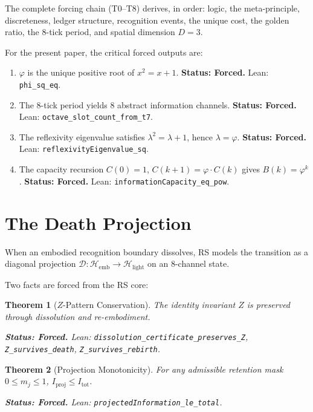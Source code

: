 \documentclass[11pt,a4paper]{article}
\newtheorem{theorem}{Theorem}[section]
\theoremstyle{definition}
\newcommand{\phig}{\varphi}
\newcommand{\Zp}{Z}
\newcommand{\code}[1]{\texttt{\small #1}}
\newcommand{\forced}[1]{\noindent\textbf{Status: Forced.} #1}
\begin{document}
The complete forcing chain (T0--T8) derives, in order:
logic, the meta-principle, discreteness, ledger structure,
recognition events, the unique cost, the golden ratio,
the 8-tick period, and spatial dimension $D=3$.

For the present paper, the critical forced outputs are:
\begin{enumerate}[label=(\roman*)]
\item $\phig$ is the unique positive root of $x^2=x+1$.
  \hfill \forced{Lean: \code{phi\_sq\_eq}.}
\item The 8-tick period yields 8 abstract information channels.
  \hfill \forced{Lean: \code{octave\_slot\_count\_from\_t7}.}
\item The reflexivity eigenvalue satisfies $\lambda^2=\lambda+1$,
  hence $\lambda=\phig$.
  \hfill \forced{Lean: \code{reflexivityEigenvalue\_sq}.}
\item The capacity recursion
  $C(0)=1$, $C(k{+}1)=\phig\cdot C(k)$ gives
  $B(k)=\phig^k$.
  \hfill \forced{Lean: \code{informationCapacity\_eq\_pow}.}
\end{enumerate}

\section{The Death Projection}
\label{sec:death}

When an embodied recognition boundary dissolves, RS models the
transition as a diagonal projection
$\mathcal{D}: \mathcal{H}_{\mathrm{emb}} \to \mathcal{H}_{\mathrm{light}}$
on an 8-channel state.

Two facts are forced from the RS core:

\begin{theorem}[$\Zp$-Pattern Conservation]
\label{thm:z-conservation}
The identity invariant $\Zp$ is preserved through dissolution and
re-embodiment.

\forced{Lean: \code{dissolution\_certificate\_preserves\_Z},
\code{Z\_survives\_death}, \code{Z\_survives\_rebirth}.}
\end{theorem}

\begin{theorem}[Projection Monotonicity]
\label{thm:proj-mono}
For any admissible retention mask $0 \le m_j \le 1$,
$I_{\mathrm{proj}} \le I_{\mathrm{tot}}$.

\forced{Lean: \code{projectedInformation\_le\_total}.}
\end{theorem}
\end{document}
